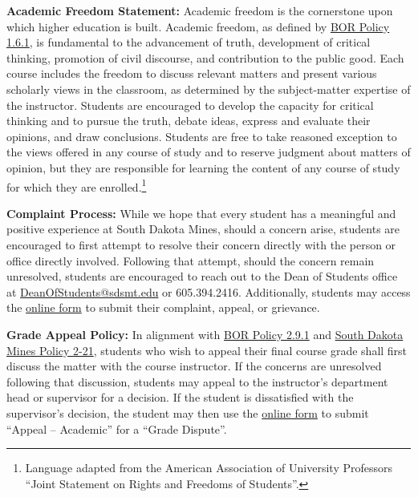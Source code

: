 \documentclass[12pt]{article}
\newcommand{\coursefield}[2]{%
  \vspace{0.2em}\noindent\textbf{#1} #2\par
}
\begin{document}
\coursefield{Academic Freedom Statement:}{Academic freedom is the cornerstone upon which higher education is built. Academic freedom, as defined by \href{https://public.powerdms.com/SDRegents/tree/documents/1729410}{BOR Policy 1.6.1}, is fundamental to the advancement of truth, development of critical thinking, promotion of civil discourse, and contribution to the public good. Each course includes the freedom to discuss relevant matters and present various scholarly views in the classroom, as determined by the subject-matter expertise of the instructor. Students are encouraged to develop the capacity for critical thinking and to pursue the truth, debate ideas, express and evaluate their opinions, and draw conclusions. Students are free to take reasoned exception to the views offered in any course of study and to reserve judgment about matters of opinion, but they are responsible for learning the content of any course of study for which they are enrolled.\footnote{Language adapted from the American Association of University Professors ``Joint Statement on Rights and Freedoms of Students''.}
}

\coursefield{Complaint Process:}{While we hope that every student has a meaningful and positive experience at South Dakota Mines, should a concern arise, students are encouraged to first attempt to resolve their concern directly with the person or office directly involved. Following that attempt, should the concern remain unresolved, students are encouraged to reach out to the Dean of Students office at \href{mailto:DeanOfStudents@sdsmt.edu}{DeanOfStudents@sdsmt.edu} or 605.394.2416. Additionally, students may access the \href{https://sdsmt-advocate.symplicity.com/public_report/index.php/pid390522?}{online form} to submit their complaint, appeal, or grievance.
}

\coursefield{Grade Appeal Policy:}{In alignment with \href{https://public.powerdms.com/SDRegents/documents/1587739}{BOR Policy 2.9.1} and \href{https://www.sdsmt.edu/about/assets/pdf-files/policy-manual/Policy\%202-21\%20Final\%20Grade\%20Appeal.pdf}{South Dakota Mines Policy 2-21}, students who wish to appeal their final course grade shall first discuss the matter with the course instructor. If the concerns are unresolved following that discussion, students may appeal to the instructor's department head or supervisor for a decision. If the student is dissatisfied with the supervisor's decision, the student may then use the \href{https://sdsmt-advocate.symplicity.com/public_report/index.php/pid844003?}{online form} to submit ``Appeal -- Academic'' for a ``Grade Dispute''.
}
\end{document}
